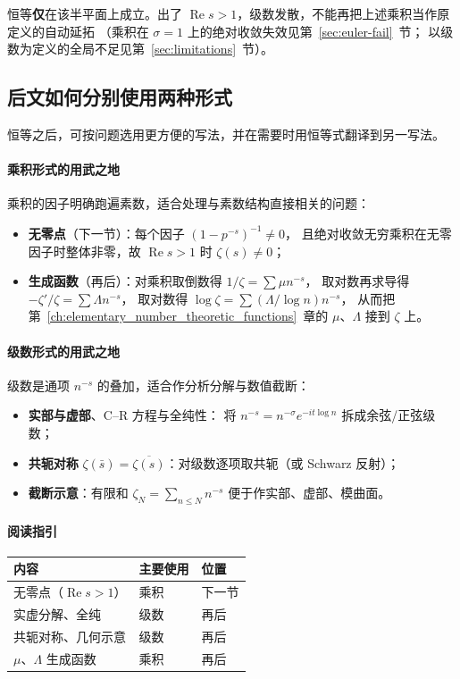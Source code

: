 恒等\textbf{仅}在该半平面上成立。出了 $\operatorname{Re}s>1$，级数发散，不能再把上述乘积当作原定义的自动延拓
（乘积在 $\sigma=1$ 上的绝对收敛失效见第~\ref{sec:euler-fail}~节；
以级数为定义的全局不足见第~\ref{sec:limitations}~节）。

\subsection{后文如何分别使用两种形式}

恒等之后，可按问题选用更方便的写法，并在需要时用恒等式翻译到另一写法。

\paragraph{乘积形式的用武之地}
乘积的因子明确跑遍素数，适合处理与素数结构直接相关的问题：
\begin{itemize}
  \item \textbf{无零点}（下一节）：每个因子 $(1-p^{-s})^{-1}\neq 0$，
        且绝对收敛无穷乘积在无零因子时整体非零，故 $\operatorname{Re}s>1$ 时 $\zeta(s)\neq 0$；
  \item \textbf{生成函数}（再后）：对乘积取倒数得 $1/\zeta=\sum\mu n^{-s}$，
        取对数再求导得 $-\zeta'/\zeta=\sum\Lambda n^{-s}$，
        取对数得 $\log\zeta=\sum(\Lambda/\log n)n^{-s}$，
        从而把第~\ref{ch:elementary_number_theoretic_functions}~章的 $\mu$、$\Lambda$ 接到 $\zeta$ 上。
\end{itemize}

\paragraph{级数形式的用武之地}
级数是通项 $n^{-s}$ 的叠加，适合作分析分解与数值截断：
\begin{itemize}
  \item \textbf{实部与虚部}、C--R 方程与全纯性：
        将 $n^{-s}=n^{-\sigma}e^{-it\log n}$ 拆成余弦/正弦级数；
  \item \textbf{共轭对称} $\zeta(\bar s)=\overline{\zeta(s)}$：对级数逐项取共轭（或 Schwarz 反射）；
  \item \textbf{截断示意}：有限和 $\zeta_N=\sum_{n\le N}n^{-s}$ 便于作实部、虚部、模曲面。
\end{itemize}

\paragraph{阅读指引}
\begin{center}
\renewcommand{\arraystretch}{1.35}
\begin{tabular}{|l|l|l|}
\hline
\textbf{内容} & \textbf{主要使用} & \textbf{位置} \\
\hline
无零点（$\operatorname{Re}s>1$） & 乘积 & 下一节 \\
实虚分解、全纯 & 级数 & 再后 \\
共轭对称、几何示意 & 级数 & 再后 \\
$\mu$、$\Lambda$ 生成函数 & 乘积 & 再后 \\
\hline
\end{tabular}
\end{center}

